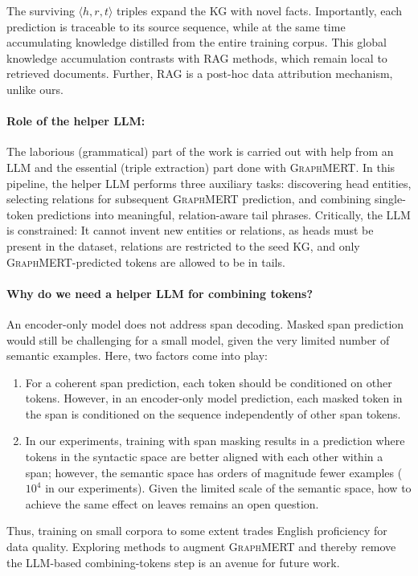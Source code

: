 \documentclass[10pt]{article}
\newcommand{\ours}{\textsc{GraphMERT}\xspace}
\begin{document}
The surviving $\langle h, r, t \rangle$ triples expand the KG with novel facts. Importantly, each prediction is traceable to its source sequence, while at the same time accumulating knowledge distilled from the entire training corpus. This global knowledge accumulation contrasts with RAG methods, which remain local to retrieved documents. Further, RAG is a post-hoc data attribution mechanism, unlike ours.

\paragraph{Role of the helper LLM:}
The laborious (grammatical) part of the work is carried out with help from an LLM and the essential (triple extraction) part done with \ours. In this pipeline, the helper LLM performs three auxiliary tasks: discovering head entities, selecting relations for subsequent \ours prediction, and combining single-token predictions into meaningful, relation-aware tail phrases. Critically, the LLM is constrained: It cannot invent new entities or relations, as heads must be present in the dataset, relations are restricted to the seed KG, and only \ours-predicted tokens are allowed to be in tails.

\paragraph{Why do we need a helper LLM for combining tokens?}
An encoder-only model does not address span decoding. Masked span prediction would still be challenging for a small model, given the very limited number of semantic examples. Here, two factors come into play:
\begin{enumerate}
    \item For a coherent span prediction, each token should be conditioned on other tokens. However, in an encoder-only model prediction, each masked token in the span is conditioned on the sequence independently of other span tokens.
    \item In our experiments, training with span masking results in a prediction where tokens in the syntactic space are better aligned with each other within a span; however, the semantic space has orders of magnitude fewer examples ($10^4$ in our experiments). Given the limited scale of the semantic space, how to achieve the same effect on leaves remains an open question.
\end{enumerate}
Thus, training on small corpora to some extent trades English proficiency for data quality. Exploring methods to augment \ours and thereby remove the LLM-based combining-tokens step is an avenue for future work.
\end{document}

